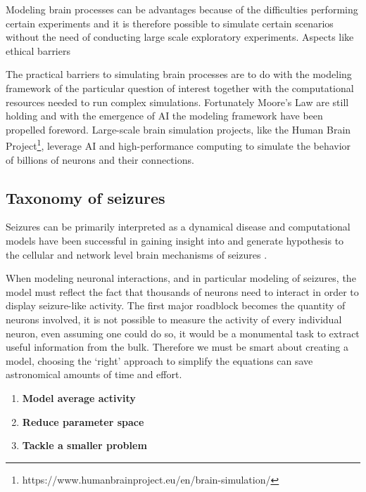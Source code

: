 \documentclass[../../Orator.tex]{subfiles}
\begin{document}
Modeling brain processes can be advantages because of the difficulties  performing certain experiments and it is therefore possible to simulate certain scenarios without the need of conducting large scale exploratory experiments. Aspects like ethical barriers

The practical barriers to simulating brain processes are to do with the modeling framework of the particular question of interest together with the computational resources needed to run complex simulations. Fortunately Moore's Law are still holding and with the emergence of AI the modeling framework have been propelled foreword. Large-scale brain simulation projects, like the Human Brain Project\footnote{https://www.humanbrainproject.eu/en/brain-simulation/}, leverage AI and high-performance computing to simulate the behavior of billions of neurons and their connections.


\subsection*{Taxonomy of seizures}

Seizures can be primarily interpreted as a dynamical disease \cite{da2003epilepsies, milton2010epilepsy} and computational models have been successful in gaining insight into and generate hypothesis to the cellular and network level brain mechanisms of seizures \cite{bazhenov2008cellular}.




When modeling neuronal interactions, and in particular modeling of seizures, the model must reflect the fact that thousands of neurons need to interact in order to display seizure-like activity. 
The first major roadblock becomes the quantity of neurons involved, it is not possible to measure the activity of every individual neuron, even assuming one could do so, it would be a monumental task to extract useful information from the bulk. 
Therefore we must be smart about creating a model, choosing the `right' approach to simplify the equations can save astronomical amounts of time and effort.
\begin{enumerate}
    \item \textbf{Model average activity}
    \item \textbf{Reduce parameter space}
    \item \textbf{Tackle a smaller problem}
\end{enumerate}
\end{document}
